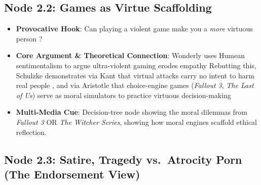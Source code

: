 \documentclass[
  a4paper,
  10pt]{article}
\begin{document}
\subsection{Node 2.2: Games as Virtue
Scaffolding}\label{node-2.2-games-as-virtue-scaffolding}

\begin{itemize}
\item
  \textbf{Provocative Hook}: Can playing a violent game make you a
  \emph{more} virtuous person
  \autocite{schulzkeDefendingMoralityViolent2010a}?
\item
  \textbf{Core Argument \& Theoretical Connection}: Wonderly uses Humean
  sentimentalism to argue ultra-violent gaming erodes empathy
  \autocite{wonderlyHumeanApproachAssessing2008a} Rebutting this,
  Schulzke demonstrates via Kant that virtual attacks carry no intent to
  harm real people \autocite{schulzkeDefendingMoralityViolent2010a}, and
  via Aristotle that choice-engine games (\emph{Fallout 3}, \emph{The
  Last of Us}) serve as moral simulators to practice virtuous
  decision-making
  \autocite{goergerValueViolenceEthics2017a,schulzkeDefendingMoralityViolent2010a}
\item
  \textbf{Multi-Media Cue}: Decision-tree node showing the moral
  dilemmas from \emph{Fallout 3} OR \emph{The Witcher Series}, showing
  how moral engines scaffold ethical reflection.
\end{itemize}

\subsection{Node 2.3: Satire, Tragedy vs.~Atrocity Porn (The Endorsement
View)}\label{node-2.3-satire-tragedy-vs.-atrocity-porn-the-endorsement-view}
\end{document}
